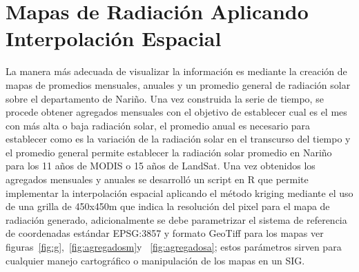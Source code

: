 \section{Mapas de Radiación Aplicando Interpolación Espacial}
 
La manera más adecuada de visualizar la información es mediante la creación de mapas de promedios mensuales, anuales y un promedio general 
de radiación solar sobre el departamento de Nariño. Una vez construida la serie de tiempo, se procede obtener agregados 
mensuales con el objetivo de establecer cual es el mes con más alta o baja radiación solar, el promedio anual es necesario para establecer como es la variación de la 
radiación solar en el transcurso del tiempo y el promedio general permite establecer la radiación solar promedio en Nariño para los 11 años de MODIS o 15 años de 
LandSat. Una vez obtenidos los agregados mensuales y anuales se desarrolló un script en R que permite implementar la interpolación espacial aplicando el método 
kriging mediante el uso de una grilla de 450x450m que indica la resolución del pixel para el mapa de radiación generado, adicionalmente se debe parametrizar 
el sistema de referencia de coordenadas estándar EPSG:3857 y formato GeoTiff para los mapas ver figuras~\ref{fig:g},~\ref{fig:agregadosm}y ~\ref{fig:agregadosa}; 
estos parámetros sirven para cualquier manejo cartográfico o manipulación de los mapas en un SIG.

